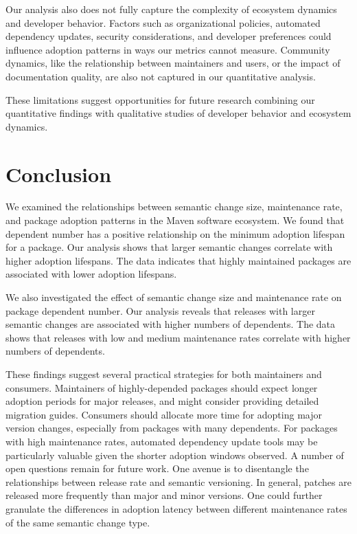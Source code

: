 \documentclass[conference]{IEEEtran}
\begin{document}
Our analysis also does not fully capture the complexity of ecosystem dynamics and developer behavior. Factors such as organizational policies, automated dependency updates, security considerations, and developer preferences could influence adoption patterns in ways our metrics cannot measure. Community dynamics, like the relationship between maintainers and users, or the impact of documentation quality, are also not captured in our quantitative analysis.

These limitations suggest opportunities for future research combining our quantitative findings with qualitative studies of developer behavior and ecosystem dynamics.

\section{Conclusion} \label{sec: conclusion}
We examined the relationships between semantic change size, maintenance rate, and package adoption patterns in the Maven software ecosystem. We found that dependent number has a positive relationship on the minimum adoption lifespan for a package. Our analysis shows that larger semantic changes correlate with higher adoption lifespans. The data indicates that highly maintained packages are associated with lower adoption lifespans.

We also investigated the effect of semantic change size and maintenance rate on package dependent number. Our analysis reveals that releases with larger semantic changes are associated with higher numbers of dependents. The data shows that releases with low and medium maintenance rates correlate with higher numbers of dependents. 

These findings suggest several practical strategies for both maintainers and consumers. Maintainers of highly-depended packages should expect longer adoption periods for major releases, and might consider providing detailed migration guides. Consumers should allocate more time for adopting major version changes, especially from packages with many dependents. For packages with high maintenance rates, automated dependency update tools may be particularly valuable given the shorter adoption windows observed. A number of open questions remain for future work.
One avenue is to disentangle the relationships between release rate and semantic versioning. In general, patches are released more frequently than major and minor versions. One could further granulate the differences in adoption latency between different maintenance rates of the same semantic change type.
\end{document}
